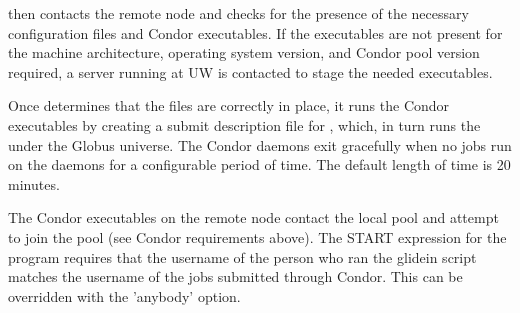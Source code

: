  then contacts the remote node and checks for the
presence of the necessary configuration files and Condor executables.
If the executables are not present for the machine architecture, 
operating system version, and Condor pool version required, a 
server running at UW is contacted to stage the needed executables.

Once  determines that the files are correctly in place,
it runs the Condor executables by creating a submit description file for 
, which, in turn runs the  under the Globus 
universe.
The Condor daemons exit gracefully when no jobs run on the daemons for a 
configurable period of time. The default length of time is 20 minutes.

The Condor executables on the remote node contact the local pool and
attempt to join the pool (see Condor requirements above). The START
expression for the  program requires that the username
of the person who ran the glidein script matches the username of the jobs 
submitted through Condor. This can be overridden with the 'anybody' option.

